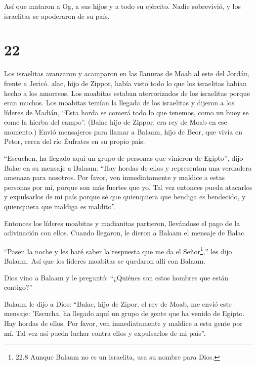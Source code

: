  Así que mataron a Og, a sus hijos y a todo su ejército.
Nadie sobrevivió, y los israelitas se apoderaron de su país.

\hypertarget{section-21}{%
\section{22}\label{section-21}}

 Los israelitas avanzaron y acamparon en las llanuras de
Moab al este del Jordán, frente a Jericó.  alac, hijo de
Zippor, había visto todo lo que los israelitas habían hecho a los
amorreos.  Los moabitas estaban aterrorizados de los
israelitas porque eran muchos. Los moabitas temían la llegada de los
israelitas  y dijeron a los líderes de Madián, ``Esta horda
se comerá todo lo que tenemos, como un buey se come la hierba del
campo''. (Balac hijo de Zippor, era rey de Moab en ese momento.)
 Envió mensajeros para llamar a Balaam, hijo de Beor, que
vivía en Petor, cerca del río Éufrates en su propio país.

``Escuchen, ha llegado aquí un grupo de personas que vinieron de
Egipto'', dijo Balac en su mensaje a Balaam. ``Hay hordas de ellos y
representan una verdadera amenaza para nosotros.  Por favor,
ven inmediatamente y maldice a estas personas por mí, porque son más
fuertes que yo. Tal vez entonces pueda atacarlos y expulsarlos de mi
país porque sé que quienquiera que bendiga es bendecido, y quienquiera
que maldiga es maldito''.

 Entonces los líderes moabitas y madianitas partieron,
llevándose el pago de la adivinación con ellos. Cuando llegaron, le
dieron a Balaam el mensaje de Balac.

 ``Pasen la noche y les haré saber la respuesta que me da el
Señor\footnote{22.8 Aunque Balaam no es un israelita, usa su nombre para
  Dios.},'' les dijo Balaam. Así que los líderes moabitas se quedaron
allí con Balaam.

 Dios vino a Balaam y le preguntó: ``¿Quiénes son estos
hombres que están contigo?''

 Balaam le dijo a Dios: ``Balac, hijo de Zipor, el rey de
Moab, me envió este mensaje:  'Escucha, ha llegado aquí un
grupo de gente que ha venido de Egipto. Hay hordas de ellos. Por favor,
ven inmediatamente y maldice a esta gente por mí. Tal vez así pueda
luchar contra ellos y expulsarlos de mi país''.

